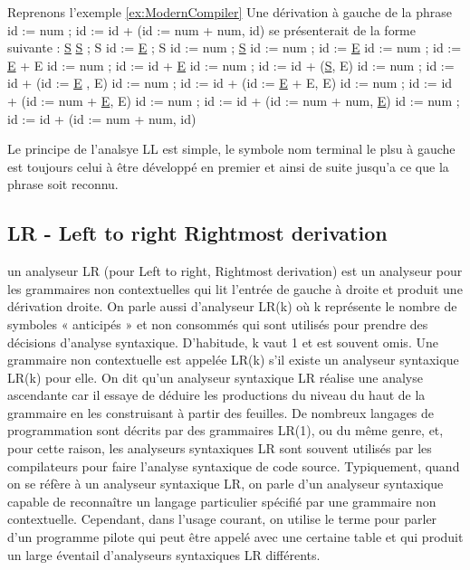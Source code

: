 \documentclass{article}
\begin{document}
Reprenons l'exemple \ref{ex:ModernCompiler} \newline
Une dérivation à gauche de la phrase id := num ; id := id + (id := num + num, id) se présenterait de la forme suivante :\newline\newline
\underline{S}\newline
\underline{S} ; S\newline
id := \underline{E} ; S\newline
id := num ; \underline{S}\newline
id := num ; id := \underline{E}\newline
id := num ; id := \underline{E} + E\newline
id := num ; id := id + \underline{E}\newline
id := num ; id := id + (\underline{S}, E)\newline
id := num ; id := id + (id := \underline{E} , E)\newline
id := num ; id := id + (id := \underline{E} + E, E)\newline
id := num ; id := id + (id := num + \underline{E}, E)\newline
id := num ; id := id + (id := num + num, \underline{E})\newline
id := num ; id := id + (id := num + num, id)\newline

Le principe de l'analsye LL est simple, le symbole nom terminal le plsu à gauche est toujours celui à être développé en premier et ainsi de suite jusqu'a ce que la phrase soit reconnu. 

\subsection{LR - Left to right Rightmost derivation}

un analyseur LR (pour Left to right, Rightmost derivation) \cite{LR} est un analyseur pour les grammaires non contextuelles qui lit l'entrée de gauche à droite et produit une dérivation droite. On parle aussi d'analyseur LR(k) où k représente le nombre de symboles « anticipés » et non consommés qui sont utilisés pour prendre des décisions d'analyse syntaxique. D'habitude, k vaut 1 et est souvent omis. Une grammaire non contextuelle est appelée LR(k) s'il existe un analyseur syntaxique LR(k) pour elle.
On dit qu'un analyseur syntaxique LR réalise une analyse ascendante car il essaye de déduire les productions du niveau du haut de la grammaire en les construisant à partir des feuilles.
De nombreux langages de programmation sont décrits par des grammaires LR(1), ou du même genre, et, pour cette raison, les analyseurs syntaxiques LR sont souvent utilisés par les compilateurs pour faire l'analyse syntaxique de code source.
Typiquement, quand on se réfère à un analyseur syntaxique LR, on parle d'un analyseur syntaxique capable de reconnaître un langage particulier spécifié par une grammaire non contextuelle. Cependant, dans l'usage courant, on utilise le terme pour parler d'un programme pilote qui peut être appelé avec une certaine table et qui produit un large éventail d'analyseurs syntaxiques LR différents.
\end{document}
